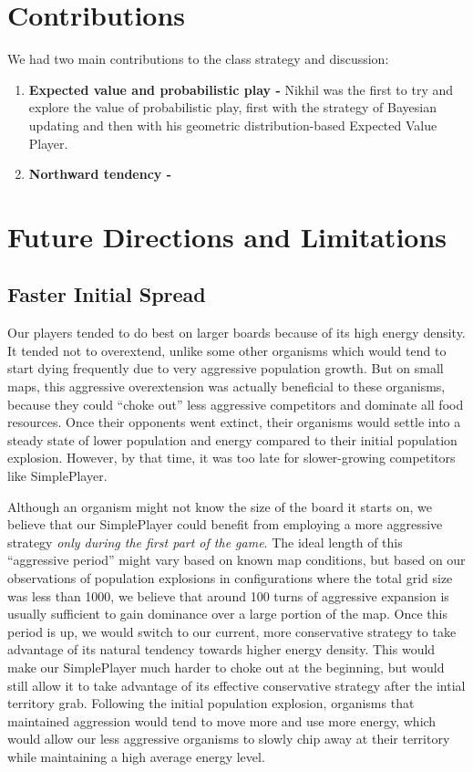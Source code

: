 \documentclass[
10pt, %
letterpaper, %
oneside, %
headinclude,footinclude, %
english
]{article}
\begin{document}
\section{Contributions}

We had two main contributions to the class strategy and discussion:
\begin{enumerate}
  \item \textbf{Expected value and probabilistic play -} Nikhil was the first to try and explore the value of probabilistic play, first with the strategy of Bayesian updating and then with his geometric distribution-based Expected Value Player.
  \item \textbf{Northward tendency -}
\end{enumerate}

\section{Future Directions and Limitations}

\subsection{Faster Initial Spread}

Our players tended to do best on larger boards because of its high energy density. It tended not to overextend, unlike some other organisms which would tend to start dying frequently due to very aggressive population growth. But on small maps, this aggressive overextension was actually beneficial to these organisms, because they could ``choke out'' less aggressive competitors and dominate all food resources. Once their opponents went extinct, their organisms would settle into a steady state of lower population and energy compared to their initial population explosion. However, by that time, it was too late for slower-growing competitors like SimplePlayer.

Although an organism might not know the size of the board it starts on, we believe that our SimplePlayer could benefit from employing a more aggressive strategy \textit{only during the first part of the game}. The ideal length of this ``aggressive period'' might vary based on known map conditions, but based on our observations of population explosions in configurations where the total grid size was less than 1000, we believe that around 100 turns of aggressive expansion is usually sufficient to gain dominance over a large portion of the map. Once this period is up, we would switch to our current, more conservative strategy to take advantage of its natural tendency towards higher energy density. This would make our SimplePlayer much harder to choke out at the beginning, but would still allow it to take advantage of its effective conservative strategy after the intial territory grab. Following the initial population explosion, organisms that maintained aggression would tend to move more and use more energy, which would allow our less aggressive organisms to slowly chip away at their territory while maintaining a high average energy level.
\end{document}
